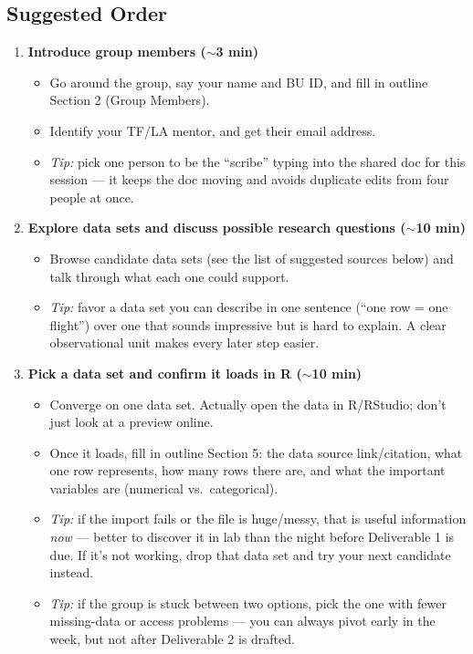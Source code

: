 \documentclass[12pt]{article}
\begin{document}
\subsection*{Suggested Order}

\begin{enumerate}
    \item \textbf{Introduce group members ($\sim$3 min)}
    \begin{itemize}
        \item Go around the group, say your name and BU ID, and fill in outline Section 2 (Group Members).
        \item Identify your TF/LA mentor, and get their email address.
        \item \emph{Tip:} pick one person to be the ``scribe'' typing into the shared doc for this session --- it keeps the doc moving and avoids duplicate edits from four people at once.
    \end{itemize}

    \item \textbf{Explore data sets and discuss possible research questions ($\sim$10 min)}
    \begin{itemize}
        \item Browse candidate data sets (see the list of suggested sources below) and talk through what each one could support. 
        \item \emph{Tip:} favor a data set you can describe in one sentence (``one row = one flight'') over one that sounds impressive but is hard to explain. A clear observational unit makes every later step easier.
    \end{itemize}

    \item \textbf{Pick a data set and confirm it loads in R ($\sim$10 min)}
    \begin{itemize}
        \item Converge on one data set. Actually open the data in R/RStudio; don't just look at a preview online.
        \item Once it loads, fill in outline Section 5: the data source link/citation, what one row represents, how many rows there are, and what the important variables are (numerical vs.\ categorical).
        \item \emph{Tip:} if the import fails or the file is huge/messy, that is useful information \emph{now} --- better to discover it in lab than the night before Deliverable 1 is due. If it's not working, drop that data set and try your next candidate instead.
        \item \emph{Tip:} if the group is stuck between two options, pick the one with fewer missing-data or access problems --- you can always pivot early in the week, but not after Deliverable 2 is drafted.
    \end{itemize}


\end{enumerate}
\end{document}
